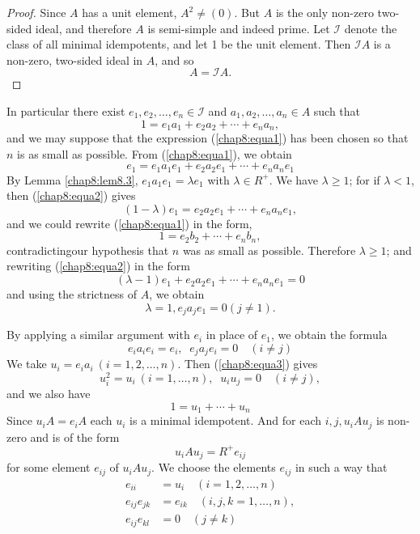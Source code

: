 \begin{proof}
  Since $A$ has a unit element, $A^2 \neq (0)$. But $A$ is the only
  non-zero two-sided ideal, and therefore $A$ is semi-simple and
  indeed prime. Let $\mathscr{I}$ denote the class of all minimal
  idempotents, and let 1 be the unit element. Then $\mathscr{I} A$ is
  a non-zero, two-sided ideal in $A$, and so 
  $$
  A= \mathscr{I} A.
  $$
\end{proof}

In particular there exist $e_1, e_2, \ldots ,e_n \in \mathscr{I}$ and
$a_1,a_2, \ldots, a_n \in A$ such that 
\begin{equation*}
  1=e_1a_1+e_2a_2+ \cdots +e_na_n, \tag{1}\label{chap8:equa1}
\end{equation*}
and we may suppose that the expression (\ref{chap8:equa1}) has been
chosen so that 
$n$ is as small as possible. From (\ref{chap8:equa1}), we obtain 
\begin{equation*}
  e_1=e_1a_1e_1+e_2a_2e_1+ \cdots +e_n a_n e_1 \tag{2}\label{chap8:equa2}
\end{equation*}
By Lemma \ref{chap8:lem8.3}, $e_1a_1e_1=\lambda e_1$ with $\lambda \in
R^+$. We have 
$\lambda \geq 1$; for if $\lambda <1$, then (\ref{chap8:equa2}) gives 
$$
(1-\lambda)e_1=e_2a_2 e_1 + \cdots + e_n a_ne_1,
$$
and we could rewrite (\ref{chap8:equa1}) in the form,
$$
1=e_2 b_2 + \cdots + e_n b_n,
$$
contradicting\pageoriginale our hypothesis that $n$ was as small as
possible. Therefore $\lambda \geq 1$; and rewriting
(\ref{chap8:equa2}) in the form  
$$
(\lambda-1)e_1 + e_2 a_2 e_1 + \cdots + e_n a_n e_1 = 0
$$
and using the strictness of $A$, we obtain
$$
\lambda = 1, e_j a_j e_1 = 0 (j \neq 1).
$$

By applying a similar argument with $e_i$ in place of $e_1$, we obtain
the formula 
\begin{equation*}
  e_i a_i e_i = e_i,  \; \; e_j a_j e_i = 0 \quad (i \neq j)
  \tag{3}\label{chap8:equa3} 
\end{equation*}
We take $u_i = e_i a_i~(i=1, 2, \ldots, n)$. Then (\ref{chap8:equa3}) gives
\begin{equation*}
  u^2_i = u_i~(i=1, \ldots,n) , \;\; u_i u_j = 0 \quad (i \neq j),
  \tag{4}\label{chap8:equa4} 
\end{equation*}
and we also have
\begin{equation*}
  1 = u_1 + \cdots + u_n \tag{5}\label{chap8:equa5} 
\end{equation*}
Since $u_i A = e_i A $ each $u_i$ is a minimal idempotent. And for
each $i, j, u_i A u_j $ is non-zero and is of the form 
$$
u_i A u_j = R^+ e_{ij}
$$
for some element $e_{ij}$ of $u_i A u_j$. We choose the elements
$e_{ij}$ in such a way that 
\begin{align*}
  e_{ii} &= u_i \quad (i = 1, 2, \ldots,n) \tag{6}\label{chap8:equa6} \\
  e_{ij} e_{jk} & = e_{ik} \quad (i, j, k = 1,\ldots,n),
  \tag{7}\label{chap8:equa7} \\ 
  e_{ij} e_{kl} & = 0 \quad (j \neq k) \tag{8}\label{chap8:equa8} 
\end{align*}\pageoriginale

